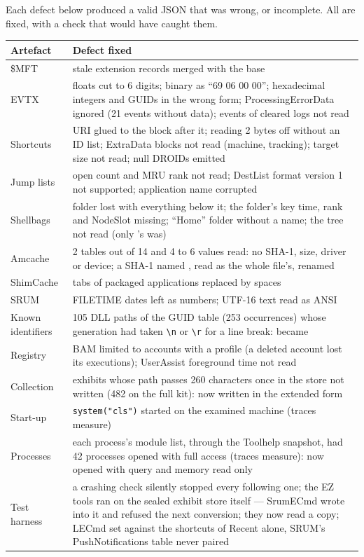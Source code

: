 \documentclass[11pt,a4paper,oneside]{report}
\begin{document}
Each defect below produced a valid JSON that was wrong, or incomplete. All are
fixed, with a check that would have caught them.

\begin{longtable}{@{}L{3.0cm}L{12.0cm}@{}}
\toprule
\textbf{Artefact} & \textbf{Defect fixed} \\
\midrule\endhead
\$MFT & stale extension records merged with the base \\
EVTX & floats cut to 6 digits; binary as ``69 06 00 00''; hexadecimal integers and GUIDs in the wrong form; ProcessingErrorData ignored (21 events without data); events of cleared logs not read \\
Shortcuts & URI glued to the block after it; reading 2 bytes off without an ID list; ExtraData blocks not read (machine, tracking); target size not read; null DROIDs emitted \\
Jump lists & open count and MRU rank not read; DestList format version 1 not supported; application name corrupted \\
Shellbags & folder lost with everything below it; the folder's key time, rank and NodeSlot missing; ``Home'' folder without a name; the  tree not read (only 's was) \\
Amcache & 2 tables out of 14 and 4 to 6 values read: no SHA-1, size, driver or device; a SHA-1 named , read as the whole file's, renamed  \\
ShimCache & tabs of packaged applications replaced by spaces \\
SRUM & FILETIME dates left as numbers; UTF-16 text read as ANSI \\
Known identifiers & 105 DLL paths of the GUID table (253 occurrences) whose generation had taken \texttt{\textbackslash n} or \texttt{\textbackslash r} for a line break:  became  \\
Registry & BAM limited to accounts with a profile (a deleted account lost its executions); UserAssist foreground time not read \\
Collection & exhibits whose path passes 260 characters once in the store not written (482 on the full kit): now written in the extended form \\
Start-up & \texttt{system("cls")} started  on the examined machine (traces measure) \\
Processes & each process's module list, through the Toolhelp snapshot, had 42 processes opened with full access (traces measure): now opened with query and memory read only \\
Test harness & a crashing check silently stopped every following one; the EZ tools ran on the sealed exhibit store itself --- SrumECmd wrote into it and \wac{} refused the next conversion; they now read a copy; LECmd set against the shortcuts of Recent alone, SRUM's PushNotifications table never paired \\
\bottomrule
\end{longtable}
\end{document}
